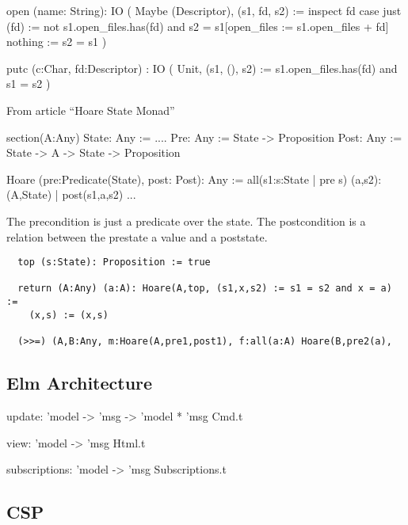 \begin{alba}
  open (name: String):
       IO ( Maybe (Descriptor),
            (s1, fd, s2) :=
               inspect fd case
                  just (fd) :=
                     not s1.open_files.has(fd)
                     and
                     s2 = s1[open_files := s1.open_files + fd]
                  nothing :=
                     s2 = s1 )

  putc (c:Char, fd:Descriptor)
       : IO ( Unit,
              (s1, (), s2) :=
                  s1.open_files.has(fd) and
                  s1 = s2 )
\end{alba}


\vspace{3cm}
\noindent From article ``Hoare State Monad''

\begin{alba}
  section(A:Any)
    State: Any := ....
    Pre: Any := State -> Proposition
    Post: Any := State -> A -> State -> Proposition

    Hoare (pre:Predicate(State), post: Post): Any :=
      all(s1:{s:State | pre s}) {(a,s2): (A,State) | post(s1,a,s2)}
    ...
\end{alba}

The precondition is just a predicate over the state. The postcondition is a
relation between the prestate a value and a poststate.

\begin{verbatim}
  top (s:State): Proposition := true

  return (A:Any) (a:A): Hoare(A,top, (s1,x,s2) := s1 = s2 and x = a) :=
    (x,s) := (x,s)

  (>>=) (A,B:Any, m:Hoare(A,pre1,post1), f:all(a:A) Hoare(B,pre2(a),
\end{verbatim}

\subsection{Elm Architecture}


\begin{ocaml}
  update: 'model -> 'msg -> 'model * 'msg Cmd.t

  view: 'model -> 'msg Html.t

  subscriptions: 'model -> 'msg Subscriptions.t
\end{ocaml}


\subsection{CSP}













